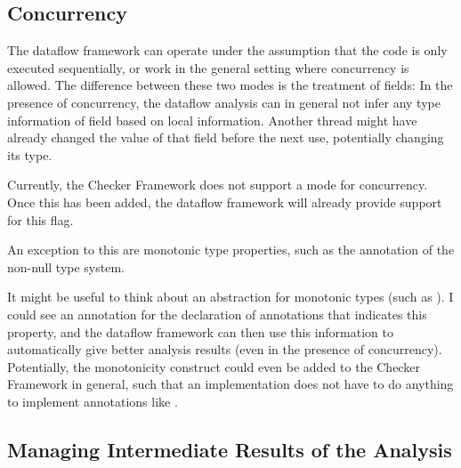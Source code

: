 \begin{new}

\subsection{Concurrency}

The dataflow framework can operate under the assumption that the code is only
executed sequentially, or work in the general setting where concurrency is allowed.
The difference between these two modes is the treatment of fields:  In the
presence of concurrency, the dataflow analysis can in general not infer any type information
of field based on local information.  Another thread might have already changed the value
of that field before the next use, potentially changing its type.

\begin{workinprogress}
    Currently, the Checker Framework does not support a mode for concurrency.  Once this
    has been added, the dataflow framework will already provide support for this flag.
\end{workinprogress}

An exception to this are monotonic type properties, such as the  annotation
of the non-null type system.

\begin{workinprogress}
    It might be useful to think about an abstraction for monotonic types (such as ).
    I could see an annotation for the declaration of annotations that indicates this property, and the
    dataflow framework can then use this information to automatically give better analysis results (even
    in the presence of concurrency).  Potentially, the monotonicity construct could even be added
    to the Checker Framework in general, such that an implementation does not have to do anything
    to implement annotations like .
\end{workinprogress}

\end{new}



\subsection{Managing Intermediate Results of the Analysis}
\label{sec:node-mapping}
\label{sec:store-management}

